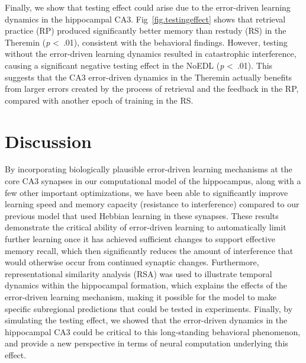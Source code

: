 \documentclass[11pt,twoside]{article}
\newif\myifpdf
\begin{document}
Finally, we show that testing effect could arise due to the error-driven learning dynamics in the hippocampal CA3.  Fig~\ref{fig.testingeffect} shows that retrieval practice (RP) produced significantly better memory than restudy (RS) in the Theremin (\emph{p} \textless \ .01), consistent with the behavioral findings.  However, testing without the error-driven learning dynamics resulted in catastrophic interference, causing a significant negative testing effect in the NoEDL (\emph{p} \textless \ .01).  This suggests that the CA3 error-driven dynamics in the Theremin actually benefits from larger errors created by the process of retrieval and the feedback in the RP, compared with another epoch of training in the RS.  

\section{Discussion}

By incorporating biologically plausible error-driven learning mechanisms at the core CA3 synapses in our computational model of the hippocampus, along with a few other important optimizations, we have been able to significantly improve learning speed and memory capacity (resistance to interference) compared to our previous model that used Hebbian learning in these synapses. These results demonstrate the critical ability of error-driven learning to automatically limit further learning once it has achieved sufficient changes to support effective memory recall, which then significantly reduces the amount of interference that would otherwise occur from continued synaptic changes.  Furthermore, representational similarity analysis (RSA) was used to illustrate temporal dynamics within the hippocampal formation, which explains the effects of the error-driven learning mechanism, making it possible for the model to make specific subregional predictions that could be tested in experiments.  Finally, by simulating the testing effect, we showed that the error-driven dynamics in the hippocampal CA3 could be critical to this long-standing behavioral phenomenon, and provide a new perspective in terms of neural computation underlying this effect.
\end{document}
